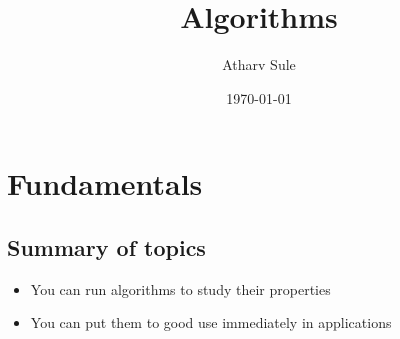 \documentclass[11pt]{report}
\author{Atharv Sule}
\date{\today}
\title{Algorithms}
\begin{document}
\maketitle
\tableofcontents


\part{Fundamentals}
\label{sec:org7f2409c}
\chapter{Summary of topics}
\label{sec:org7d25c30}
\begin{itemize}
\item You can run algorithms to study their properties
\item You can put them to good use immediately in applications
\end{itemize}
\end{document}
